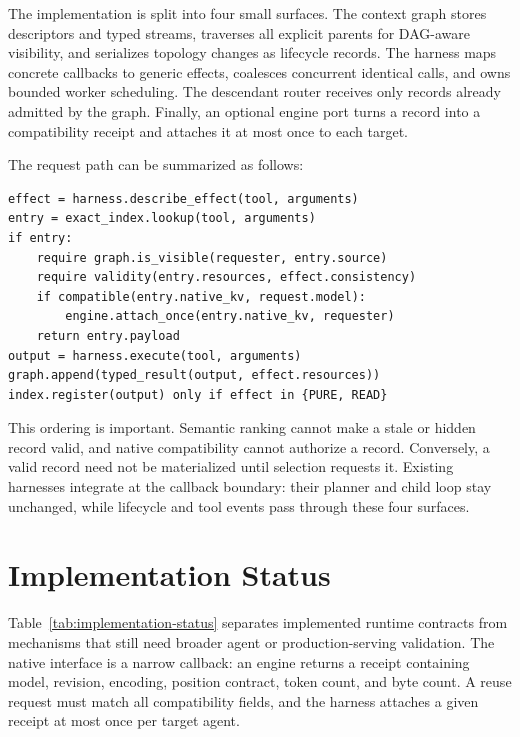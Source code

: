 \documentclass[11pt]{article}
\begin{document}
The implementation is split into four small surfaces. The context graph stores
descriptors and typed streams, traverses all explicit parents for DAG-aware
visibility, and serializes topology changes as lifecycle records. The harness
maps concrete callbacks to generic effects, coalesces concurrent identical
calls, and owns bounded worker scheduling. The descendant router receives only
records already admitted by the graph. Finally, an optional engine port turns a
record into a compatibility receipt and attaches it at most once to each target.

The request path can be summarized as follows:

\begin{lstlisting}[basicstyle=\ttfamily\small]
effect = harness.describe_effect(tool, arguments)
entry = exact_index.lookup(tool, arguments)
if entry:
    require graph.is_visible(requester, entry.source)
    require validity(entry.resources, effect.consistency)
    if compatible(entry.native_kv, request.model):
        engine.attach_once(entry.native_kv, requester)
    return entry.payload
output = harness.execute(tool, arguments)
graph.append(typed_result(output, effect.resources))
index.register(output) only if effect in {PURE, READ}
\end{lstlisting}

This ordering is important. Semantic ranking cannot make a stale or hidden
record valid, and native compatibility cannot authorize a record. Conversely,
a valid record need not be materialized until selection requests it. Existing
harnesses integrate at the callback boundary: their planner and child loop stay
unchanged, while lifecycle and tool events pass through these four surfaces.

\section{Implementation Status}

Table~\ref{tab:implementation-status} separates implemented runtime contracts
from mechanisms that still need broader agent or production-serving validation.
The
native interface is a narrow callback: an engine returns a receipt containing
model, revision, encoding, position contract, token count, and byte count. A
reuse request must match all compatibility fields, and the harness attaches a
given receipt at most once per target agent.
\end{document}

